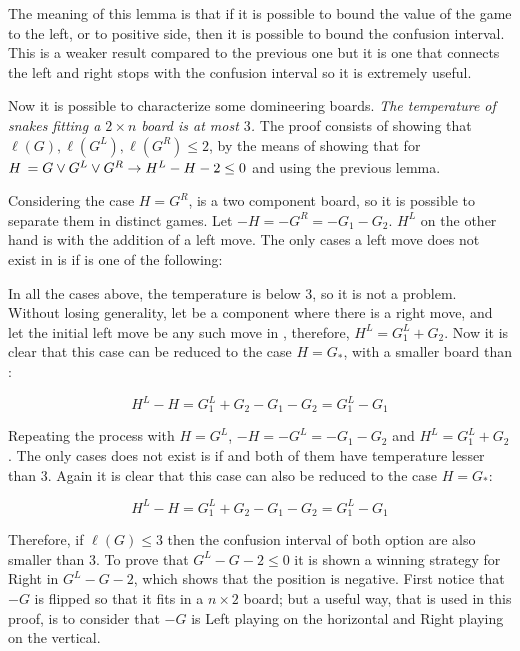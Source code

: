 The meaning of this lemma is that if it is possible to bound the value of the game to the left, or to positive side, then it is possible to bound the confusion interval. This is a weaker result compared to the previous one but it is one that connects the left and right stops with the confusion interval so it is extremely useful.

Now it is possible to characterize some domineering boards. \textit{The temperature of snakes fitting a $2\times n$ board is at most $3$.} The proof consists of showing that $\ell(G), \ell(G^L), \ell(G^R) \leq 2$, by the means of showing that for $\mbox{$H\,$} = G \lor G^L \lor G^R \rightarrow H^L -H -2 \leq 0$ and using the previous lemma.

Considering the case $H = G^R$, \Hm is a two component board, so it is possible to separate them in distinct games. Let $-H = -G^R = -G_1 - G_2$. $H^L$ on the other hand is  with the addition of a left move. The only cases a left move does not exist in  is if \Gm{} is one of the following:



In all the cases above, the temperature is below 3, so it is not a problem. Without losing generality, let  be a component where there is a right move, and let the initial left move be any such move in , therefore, $H^L = G_1^L + G_2$. Now it is clear that this case can be reduced to the case $H = G_*$, with \Gm{_*} a smaller board than \Gm{}:

$$
H^L - H = G_1^L + G_2 - G_1 - G_2 = G_1^L - G_1
$$

Repeating the process with $H = G^L$, $-H = -G^L = -G_1 - G_2$ and $H^L = G_1^L + G_2$. The only cases  does not exist is if
 and both of them have temperature lesser than 3. Again it is clear that this case can also be reduced to the case $H = G_*$:

$$
H^L - H = G_1^L + G_2 - G_1 - G_2 = G_1^L - G_1
$$

Therefore, if $\ell(G) \leq 3$ then the confusion interval of both option are also smaller than 3. To prove that $G^L - G - 2 \leq 0$ it is shown a winning strategy for Right in $G^L - G - 2$, which shows that the position is negative. First notice that $-G$ is \Gm{} flipped so that it fits in a $n\times 2$ board; but a useful way, that is used in this proof, is to consider that $-G$ is Left playing on the horizontal and Right playing on the vertical.

